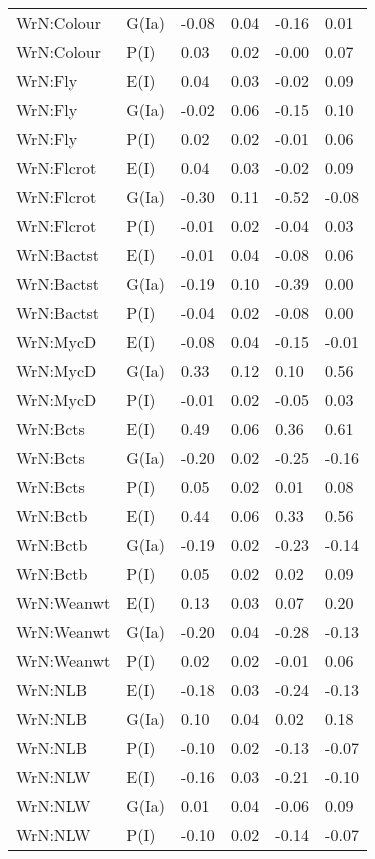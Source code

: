 \begin{center}
\begin{longtable}{|p{1.1in}|p{0.7in}|p{0.7in}|p{0.6in}|p{0.6in}|p{0.6in}|}
  WrN:Colour & G(Ia) & -0.08 & 0.04 & -0.16 & 0.01 \\ 
  WrN:Colour & P(I) & 0.03 & 0.02 & -0.00 & 0.07 \\ 
  WrN:Fly & E(I) & 0.04 & 0.03 & -0.02 & 0.09 \\ 
  WrN:Fly & G(Ia) & -0.02 & 0.06 & -0.15 & 0.10 \\ 
  WrN:Fly & P(I) & 0.02 & 0.02 & -0.01 & 0.06 \\ 
  WrN:Flcrot & E(I) & 0.04 & 0.03 & -0.02 & 0.09 \\ 
  WrN:Flcrot & G(Ia) & -0.30 & 0.11 & -0.52 & -0.08 \\ 
  WrN:Flcrot & P(I) & -0.01 & 0.02 & -0.04 & 0.03 \\ 
  WrN:Bactst & E(I) & -0.01 & 0.04 & -0.08 & 0.06 \\ 
  WrN:Bactst & G(Ia) & -0.19 & 0.10 & -0.39 & 0.00 \\ 
  WrN:Bactst & P(I) & -0.04 & 0.02 & -0.08 & 0.00 \\ 
  WrN:MycD & E(I) & -0.08 & 0.04 & -0.15 & -0.01 \\ 
  WrN:MycD & G(Ia) & 0.33 & 0.12 & 0.10 & 0.56 \\ 
  WrN:MycD & P(I) & -0.01 & 0.02 & -0.05 & 0.03 \\ 
  WrN:Bcts & E(I) & 0.49 & 0.06 & 0.36 & 0.61 \\ 
  WrN:Bcts & G(Ia) & -0.20 & 0.02 & -0.25 & -0.16 \\ 
  WrN:Bcts & P(I) & 0.05 & 0.02 & 0.01 & 0.08 \\ 
  WrN:Bctb & E(I) & 0.44 & 0.06 & 0.33 & 0.56 \\ 
  WrN:Bctb & G(Ia) & -0.19 & 0.02 & -0.23 & -0.14 \\ 
  WrN:Bctb & P(I) & 0.05 & 0.02 & 0.02 & 0.09 \\ 
  WrN:Weanwt & E(I) & 0.13 & 0.03 & 0.07 & 0.20 \\ 
  WrN:Weanwt & G(Ia) & -0.20 & 0.04 & -0.28 & -0.13 \\ 
  WrN:Weanwt & P(I) & 0.02 & 0.02 & -0.01 & 0.06 \\ 
  WrN:NLB & E(I) & -0.18 & 0.03 & -0.24 & -0.13 \\ 
  WrN:NLB & G(Ia) & 0.10 & 0.04 & 0.02 & 0.18 \\ 
  WrN:NLB & P(I) & -0.10 & 0.02 & -0.13 & -0.07 \\ 
  WrN:NLW & E(I) & -0.16 & 0.03 & -0.21 & -0.10 \\ 
  WrN:NLW & G(Ia) & 0.01 & 0.04 & -0.06 & 0.09 \\ 
  WrN:NLW & P(I) & -0.10 & 0.02 & -0.14 & -0.07 \\ 

\end{longtable}
\end{center}
